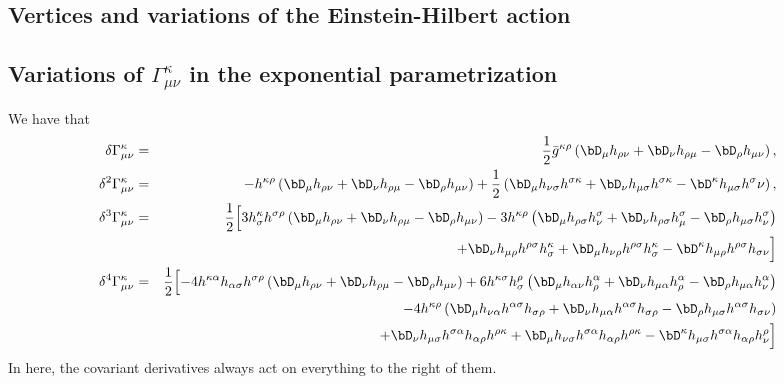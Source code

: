 \documentclass[11pt]{book} %
\newcommand{\bea}{\begin{eqnarray}}
\newcommand{\eea}{\end{eqnarray}}
\numberwithin{equation}{chapter}
\begin{document}
\begin{appendices}
\chapter{Vertices and variations of the Einstein-Hilbert action}
\label{app:EH}

\section{Variations of $\Gamma_{\mu \nu}^{\kappa}$ in the exponential parametrization}

We have that
\bea
\delta \Gamma_{\mu \nu}^{\kappa} &=& \frac{1}{2}\bar{g}^{\kappa \rho} \left(\bD_{\mu}h_{\rho \nu}+ \bD_{\nu}h_{\rho \mu} - \bD_{\rho}h_{\mu \nu} \right),\\
%
\delta^2 \Gamma_{\mu \nu}^{\kappa} &=&-h^{\kappa \rho}\left(\bD_{\mu}h_{\rho \nu}+ \bD_{\nu}h_{\rho \mu} - \bD_{\rho}h_{\mu \nu} \right)+ \frac{1}{2}\left(\bD_{\mu}h_{\nu\sigma}h^{\sigma \kappa} + \bD_{\nu} h_{\mu \sigma}h^{\sigma \kappa} - \bD^{\kappa}h_{\mu \sigma}h^{\sigma}{\nu} \right),\\
%
\delta^3 \Gamma_{\mu \nu}^{\kappa} &=&\frac{1}{2}\Bigl[ 3 h^{\kappa}_{\sigma} h^{\sigma \rho}\left(\bD_{\mu}h_{\rho \nu}+ \bD_{\nu}h_{\rho \mu} - \bD_{\rho}h_{\mu \nu} \right) -3 h^{\kappa \rho} \left(\bD_{\mu}h_{\rho \sigma}h^{\sigma}_{\nu}+ \bD_{\nu}h_{\rho \sigma}h^{\sigma}_{\mu} - \bD_{\rho}h_{\mu \sigma}h^{\sigma}_{\nu} \right)\nonumber\\
&{}& +\bD_{\nu}h_{\mu \rho}h^{\rho \sigma}h_{\sigma}^{\kappa} + \bD_{\mu}h_{\nu \rho}h^{\rho \sigma}h_{\sigma}^{\kappa}- \bD^{\kappa}h_{\mu \rho}h^{\rho \sigma}h_{\sigma\nu}\Bigr]\\
\delta^4 \Gamma_{\mu \nu}^{\kappa}&=& \frac{1}{2}\Bigl[ - 4 h^{\kappa \alpha}h_{\alpha \sigma}h^{\sigma \rho}\left(\bD_{\mu}h_{\rho \nu}+ \bD_{\nu}h_{\rho \mu} - \bD_{\rho}h_{\mu \nu} \right) + 6 h^{\kappa \sigma}h_{\sigma}^{\rho} \left( \bD_{\mu}h_{\alpha \nu}h^{\alpha}_{\rho} +\bD_{\nu} h_{\mu \alpha}h^{\alpha}_{\rho} - \bD_{\rho}h_{\mu \alpha}h^{\alpha}_{\nu}\right)\nonumber\\
&{}& - 4h^{\kappa \rho}\left( \bD_{\mu}h_{\nu \alpha}h^{\alpha \sigma}h_{\sigma\rho} + \bD_{\nu}h_{\mu \alpha}h^{\alpha \sigma}h_{\sigma\rho}- \bD_{\rho}h_{\mu \sigma}h^{\alpha \sigma}h_{\sigma \nu} \right) \nonumber\\
&{}&+ \bD_{\nu}h_{\mu \sigma}h^{\sigma \alpha}h_{\alpha\rho}h^{\rho \kappa}+\bD_{\mu}h_{\nu \sigma}h^{\sigma \alpha}h_{\alpha\rho}h^{\rho \kappa} - \bD^{\kappa}h_{\mu \sigma}h^{\sigma \alpha}h_{\alpha \rho}h^{\rho}_{\nu}\Bigr]
\eea
In here, the covariant derivatives always act on everything to the right of them.


\end{appendices}
\end{document}
